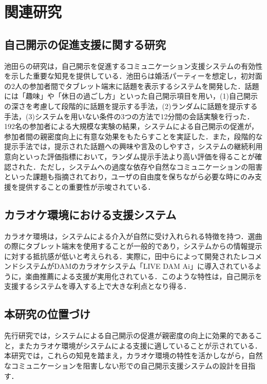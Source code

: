\section{関連研究}\label{関連研究}

\subsection{自己開示の促進支援に関する研究}
池田ら\cite{自己開示の促しによるコミュニケーション支援システム}の研究は，自己開示を促進するコミュニケーション支援システムの有効性を示した重要な知見を提供している．池田らは婚活パーティーを想定し，初対面の2人の参加者間でタブレット端末に話題を表示するシステムを開発した．話題には「趣味」や「休日の過ごし方」といった自己開示項目を用い，(1)自己開示の深さを考慮して段階的に話題を提示する手法，(2)ランダムに話題を提示する手法，(3)システムを用いない条件の3つの方法で12分間の会話実験を行った．192名の参加者による大規模な実験の結果，システムによる自己開示の促進が，参加者間の親密度向上に有意な効果をもたらすことを実証した．また，段階的な提示手法では，提示された話題への興味や言及のしやすさ，システムの継続利用意向といった評価指標において，ランダム提示手法より高い評価を得ることが確認された．ただし，システムへの過度な依存や自然なコミュニケーションの阻害といった課題も指摘されており，ユーザの自由度を保ちながら必要な時にのみ支援を提供することの重要性が示唆されている．

\subsection{カラオケ環境における支援システム}
カラオケ環境は，システムによる介入が自然に受け入れられる特徴を持つ．選曲の際にタブレット端末を使用することが一般的であり，システムからの情報提示に対する抵抗感が低いと考えられる．実際に，田中ら\cite{tanaka_2020}によって開発されたレコメンドシステムがDAM\cite{DAM}のカラオケシステム「LIVE DAM Ai」に導入されているように，楽曲推薦による支援が実用化されている．このような特性は，自己開示を支援するシステムを導入する上で大きな利点となり得る．

\subsection{本研究の位置づけ}
先行研究では，システムによる自己開示の促進が親密度の向上に効果的であること，またカラオケ環境がシステムによる支援に適していることが示されている．本研究では，これらの知見を踏まえ，カラオケ環境の特性を活かしながら，自然なコミュニケーションを阻害しない形での自己開示支援システムの設計を目指す．